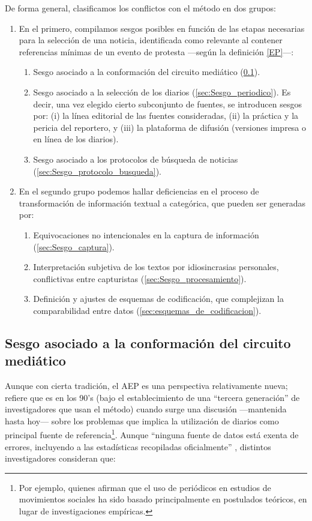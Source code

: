 \documentclass[letterpaper, 11pt]{book}
\theoremstyle{definition}
\theoremstyle{remark}
\begin{document}
De forma general, clasificamos los conflictos con el método en dos grupos:

\begin{enumerate}
    \item En el primero, compilamos sesgos posibles en función de las etapas necesarias para la selección de una noticia, identificada como relevante al contener referencias mínimas de un evento de protesta ---según la definición \ref{EP}---:
	\begin{enumerate}
	    \item Sesgo asociado a la conformación del circuito mediático (\ref{sec:Sesgo_circuito_mediatico}). 
	    \item Sesgo asociado a la selección de los diarios (\ref{sec:Sesgo_periodico}). Es decir, una vez elegido cierto subconjunto de fuentes, se introducen sesgos por: (i) la línea editorial de las fuentes consideradas, (ii) la práctica y la pericia del reportero, 
	    y (iii) la plataforma de difusión (versiones impresa o en línea de los diarios).
	    \item Sesgo asociado a los protocolos de búsqueda de noticias (\ref{sec:Sesgo_protocolo_busqueda}).
	\end{enumerate}
    \item En el segundo grupo podemos hallar deficiencias en el proceso de transformación de información textual a categórica, que pueden ser generadas por:
	\begin{enumerate}
	    \item Equivocaciones no intencionales en la captura de información (\ref{sec:Sesgo_captura}).
	    \item Interpretación subjetiva de los textos por idiosincrasias personales, conflictivas entre capturistas (\ref{sec:Sesgo_procesamiento}).
	    \item Definición y ajustes de esquemas de codificación, que complejizan la comparabilidad entre datos (\ref{sec:esquemas_de_codificacion}).
	\end{enumerate}

\end{enumerate}




\subsection{Sesgo asociado a la conformación del circuito mediático}
\label{sec:Sesgo_circuito_mediatico}


Aunque con cierta tradición, el AEP es una perspectiva relativamente nueva; \citet{2014_Hutter_AEP} refiere que es en los 90's (bajo el establecimiento de una ``tercera generación'' de investigadores que usan el método) cuando surge una discusión ---mantenida hasta hoy--- sobre los problemas que implica la utilización de diarios como principal fuente de referencia\footnote{Por ejemplo, \citet{1999_BarrancoET_ValidityNewspapers} quienes afirman que el uso de periódicos en estudios de movimientos sociales ha sido basado principalmente en postulados teóricos, en lugar de investigaciones empíricas.}. Aunque ``ninguna fuente de datos está exenta de errores, incluyendo a las estadísticas recopiladas oficialmente'' \citep[7]{1987_Franzosi_Press}, distintos investigadores consideran que:
\end{document}
